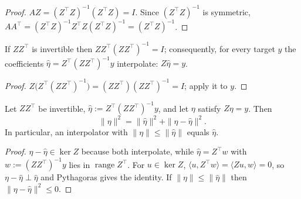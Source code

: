 \begin{proof}
  \leanok
$AZ=(Z^\top Z)^{-1}(Z^\top Z)=I$. Since $(Z^\top Z)^{-1}$ is symmetric,
$AA^\top=(Z^\top Z)^{-1}Z^\top Z(Z^\top Z)^{-1}=(Z^\top Z)^{-1}$.
\end{proof}

\begin{lemma}\label{lem:dd:rightInverse}
  \leanok
If $ZZ^\top$ is invertible then $ZZ^\top(ZZ^\top)^{-1}=I$; consequently, for every target $y$ the coefficients
$\hat\eta=Z^\top(ZZ^\top)^{-1}y$ interpolate: $Z\hat\eta=y$.
\end{lemma}

\begin{proof}
  \leanok
$Z\bigl(Z^\top(ZZ^\top)^{-1}\bigr)=(ZZ^\top)(ZZ^\top)^{-1}=I$; apply it to $y$.
\end{proof}

\begin{theorem}\label{thm:dd:minNorm}
  \leanok
Let $ZZ^\top$ be invertible, $\hat\eta:=Z^\top(ZZ^\top)^{-1}y$, and let $\eta$ satisfy $Z\eta=y$. Then
\[
  \|\eta\|^2=\|\hat\eta\|^2+\|\eta-\hat\eta\|^2 .
\]
In particular, an interpolator with $\|\eta\|\le\|\hat\eta\|$ equals $\hat\eta$.
\end{theorem}

\begin{proof}
  \leanok
$\eta-\hat\eta\in\ker Z$ because both interpolate, while $\hat\eta=Z^\top w$ with $w:=(ZZ^\top)^{-1}y$ lies in $\operatorname{range}Z^\top$.
For $u\in\ker Z$, $\langle u,Z^\top w\rangle=\langle Zu,w\rangle=0$, so $\eta-\hat\eta\perp\hat\eta$ and Pythagoras gives the
identity. If $\|\eta\|\le\|\hat\eta\|$ then $\|\eta-\hat\eta\|^2\le0$.
\end{proof}

